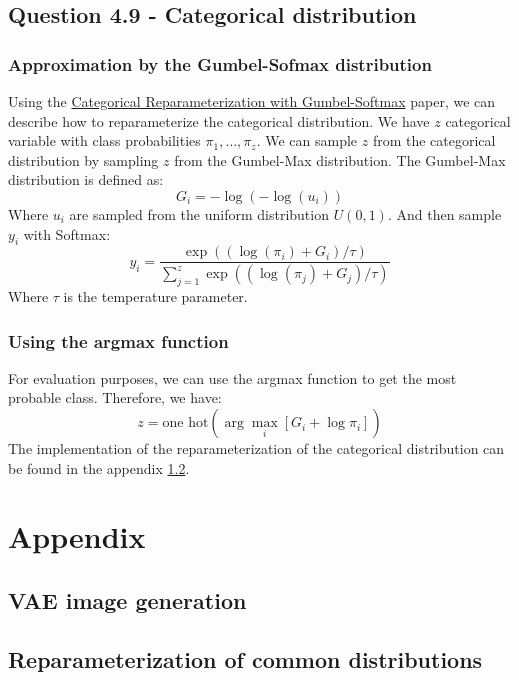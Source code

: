 \documentclass{article}
\begin{document}
\subsection{Question 4.9 - Categorical distribution}
\subsubsection{Approximation by the Gumbel-Sofmax distribution}
Using the \href{https://arxiv.org/abs/1611.01144}{Categorical Reparameterization with Gumbel-Softmax} paper, we can describe how to reparameterize the categorical distribution.
We have $z$ categorical variable with class probabilities $\pi_1, \dots, \pi_z$. We can sample $z$ from the categorical distribution by sampling $z$ from the Gumbel-Max distribution. The Gumbel-Max distribution is defined as:
\begin{equation}
  G_i = -\log(-\log(u_i))
\end{equation}
Where $u_i$ are sampled from the uniform distribution $U(0,1)$. And then sample $y_i$ with Softmax:
\begin{equation}
  y_i = \frac{\exp((\log(\pi_i) + G_i)/\tau)}{\sum_{j=1}^{z}\exp((\log(\pi_j) + G_j)/\tau)}
\end{equation}
Where $\tau$ is the temperature parameter.

\subsubsection{Using the argmax function}
For evaluation purposes, we can use the argmax function to get the most probable class. Therefore, we have:
\begin{equation}
  z = \text{one hot} \left(\arg\max_i [G_i + \log \pi_i]\right)
\end{equation}
The implementation of the reparameterization of the categorical distribution can be found in the appendix \ref{appendix:1.4}.

\newpage
\appendix

\section{Appendix}
\subsection{VAE image generation}\label{appendix:1.2}


\subsection{Reparameterization of common distributions}\label{appendix:1.4}

\end{document}
